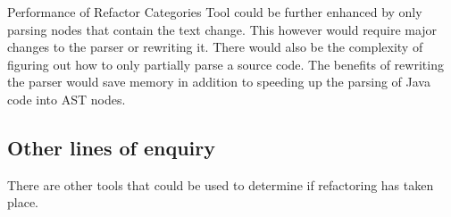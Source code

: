Performance of Refactor Categories Tool could be further enhanced by only parsing nodes that contain the text change.  This however would require major changes to the parser or rewriting it. There would also be the complexity of figuring out how to only partially parse a source code. The benefits of rewriting the parser would save memory in addition to speeding up the parsing of Java code into AST nodes.


\subsection{Other lines of enquiry}

There are other tools that could be used to determine if refactoring has taken place.


% 
% 
% 
% 
% 
% 
